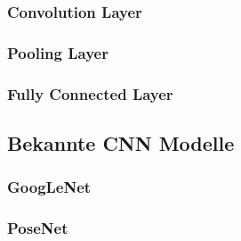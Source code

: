 \subsubsection{Convolution Layer}
\subsubsection{Pooling Layer}
\subsubsection{Fully Connected Layer}
\subsection{Bekannte CNN Modelle}
\subsubsection{GoogLeNet}
\subsubsection{PoseNet}

\pagebreak